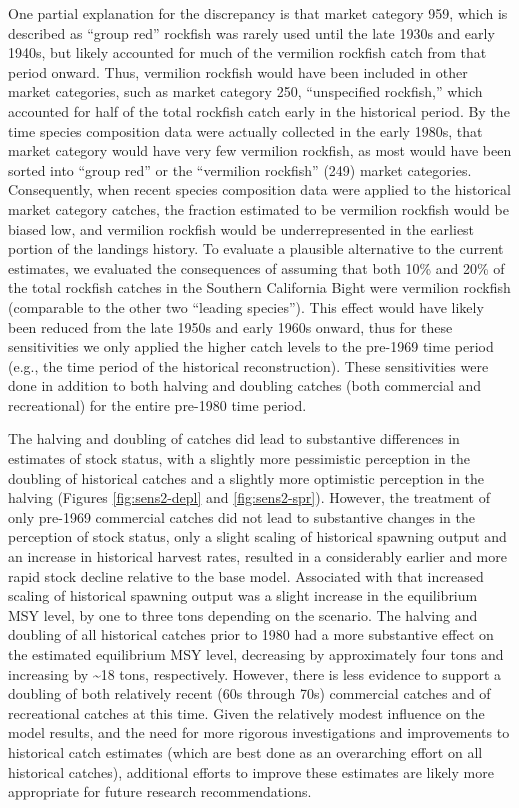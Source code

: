 \documentclass[11pt,
  english,
]{article}
\begin{document}
One partial explanation for the discrepancy is that market category 959, which is described as ``group red'' rockfish was rarely used until the late 1930s and early 1940s, but likely accounted for much of the vermilion rockfish catch from that period onward. Thus, vermilion rockfish would have been included in other market categories, such as market category 250, ``unspecified rockfish,'' which accounted for half of the total rockfish catch early in the historical period. By the time species composition data were actually collected in the early 1980s, that market category would have very few vermilion rockfish, as most would have been sorted into ``group red'' or the ``vermilion rockfish'' (249) market categories. Consequently, when recent species composition data were applied to the historical market category catches, the fraction estimated to be vermilion rockfish would be biased low, and vermilion rockfish would be underrepresented in the earliest portion of the landings history. To evaluate a plausible alternative to the current estimates, we evaluated the consequences of assuming that both 10\% and 20\% of the total rockfish catches in the Southern California Bight were vermilion rockfish (comparable to the other two ``leading species''). This effect would have likely been reduced from the late 1950s and early 1960s onward, thus for these sensitivities we only applied the higher catch levels to the pre-1969 time period (e.g., the time period of the historical reconstruction). These sensitivities were done in addition to both halving and doubling catches (both commercial and recreational) for the entire pre-1980 time period.

The halving and doubling of catches did lead to substantive differences in estimates of stock status, with a slightly more pessimistic perception in the doubling of historical catches and a slightly more optimistic perception in the halving (Figures \ref{fig:sens2-depl} and \ref{fig:sens2-spr}). However, the treatment of only pre-1969 commercial catches did not lead to substantive changes in the perception of stock status, only a slight scaling of historical spawning output and an increase in historical harvest rates, resulted in a considerably earlier and more rapid stock decline relative to the base model. Associated with that increased scaling of historical spawning output was a slight increase in the equilibrium MSY level, by one to three tons depending on the scenario. The halving and doubling of all historical catches prior to 1980 had a more substantive effect on the estimated equilibrium MSY level, decreasing by approximately four tons and increasing by \textasciitilde18 tons, respectively. However, there is less evidence to support a doubling of both relatively recent (60s through 70s) commercial catches and of recreational catches at this time. Given the relatively modest influence on the model results, and the need for more rigorous investigations and improvements to historical catch estimates (which are best done as an overarching effort on all historical catches), additional efforts to improve these estimates are likely more appropriate for future research recommendations.
\end{document}
